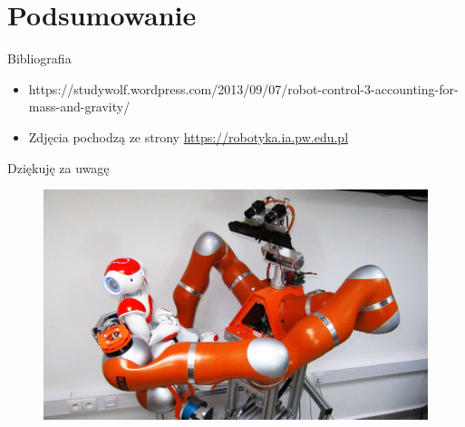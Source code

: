 \documentclass{beamer}
\begin{document}
%
%
\section{Podsumowanie}
\begin{frame}{Bibliografia}
\begin{itemize}
	\item https://studywolf.wordpress.com/2013/09/07/robot-control-3-accounting-for-mass-and-gravity/
	\item Zdjęcia pochodzą ze strony \url{https://robotyka.ia.pw.edu.pl}
	 
\end{itemize}

\end{frame}
\begin{frame}{Dziękuję za uwagę}
\begin{figure}[h]
	\centering
	\includegraphics[scale=1.4]{velma3}
\end{figure}
\end{frame}
\end{document}
